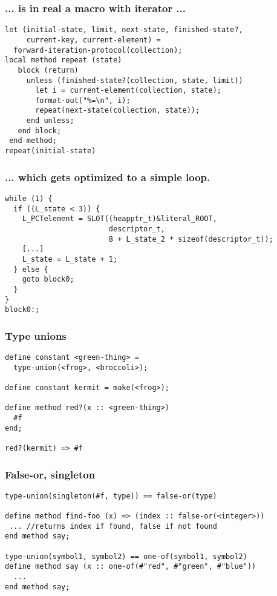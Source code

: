 \documentclass[compress]{beamer}
\begin{document}
\begin{frame}[fragile]
  \frametitle{... is in real a macro with iterator ...}
  \begin{verbatim}
let (initial-state, limit, next-state, finished-state?,
     current-key, current-element) =
  forward-iteration-protocol(collection);
local method repeat (state)
   block (return)
     unless (finished-state?(collection, state, limit))
       let i = current-element(collection, state);
       format-out("%=\n", i);
       repeat(next-state(collection, state));
     end unless;
   end block;
 end method;
repeat(initial-state)
  \end{verbatim}
\end{frame}

\begin{frame}[fragile]
  \frametitle{... which gets optimized to a simple loop.}
  \begin{footnotesize}
  \begin{verbatim}
while (1) {
  if ((L_state < 3)) {
    L_PCTelement = SLOT((heapptr_t)&literal_ROOT,
                        descriptor_t,
                        8 + L_state_2 * sizeof(descriptor_t));
    [...]
    L_state = L_state + 1;
  } else {
    goto block0;
  }
}
block0:;
  \end{verbatim}
  \end{footnotesize}
\end{frame}

\begin{frame}[fragile]
  \frametitle{Type unions}
  \begin{verbatim}
define constant <green-thing> =
  type-union(<frog>, <broccoli>);

define constant kermit = make(<frog>);

define method red?(x :: <green-thing>)
  #f
end;

red?(kermit) => #f
  \end{verbatim}
\end{frame}

\begin{frame}[fragile]
  \frametitle{False-or, singleton}
  \begin{verbatim}
type-union(singleton(#f, type)) == false-or(type)

define method find-foo (x) => (index :: false-or(<integer>))
 ... //returns index if found, false if not found
end method say;

type-union(symbol1, symbol2) == one-of(symbol1, symbol2)
define method say (x :: one-of(#"red", #"green", #"blue"))
  ...
end method say;
  \end{verbatim}
\end{frame}
\end{document}
